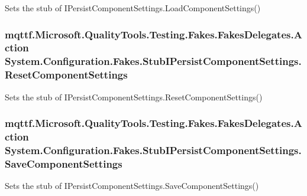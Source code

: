 Sets the stub of I\-Persist\-Component\-Settings.\-Load\-Component\-Settings()

\hypertarget{class_system_1_1_configuration_1_1_fakes_1_1_stub_i_persist_component_settings_ad5774e66a65b3a926679e325b9ae84ec}{
\subsubsection[{Reset\-Component\-Settings}]{\setlength{\rightskip}{0pt plus 5cm}mqttf.\-Microsoft.\-Quality\-Tools.\-Testing.\-Fakes.\-Fakes\-Delegates.\-Action System.\-Configuration.\-Fakes.\-Stub\-I\-Persist\-Component\-Settings.\-Reset\-Component\-Settings}}\label{class_system_1_1_configuration_1_1_fakes_1_1_stub_i_persist_component_settings_ad5774e66a65b3a926679e325b9ae84ec}


Sets the stub of I\-Persist\-Component\-Settings.\-Reset\-Component\-Settings()

\hypertarget{class_system_1_1_configuration_1_1_fakes_1_1_stub_i_persist_component_settings_ad4cf0f9516f3cdedd4da3c8907f5125e}{
\subsubsection[{Save\-Component\-Settings}]{\setlength{\rightskip}{0pt plus 5cm}mqttf.\-Microsoft.\-Quality\-Tools.\-Testing.\-Fakes.\-Fakes\-Delegates.\-Action System.\-Configuration.\-Fakes.\-Stub\-I\-Persist\-Component\-Settings.\-Save\-Component\-Settings}}\label{class_system_1_1_configuration_1_1_fakes_1_1_stub_i_persist_component_settings_ad4cf0f9516f3cdedd4da3c8907f5125e}


Sets the stub of I\-Persist\-Component\-Settings.\-Save\-Component\-Settings()

